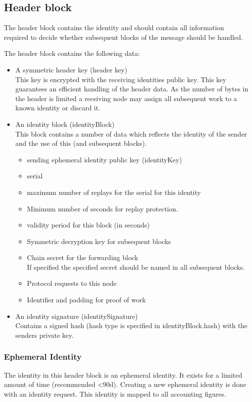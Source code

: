 \subsection{Header block}
The header block contains the identity and should contain all information required to decide whether subsequent blocks of the message should be handled.

The header block contains the following data:
\begin{itemize}
	\item A symmetric header key (header key)\\
	      This key is encrypted with the receiving identities public key. This key guarantees an efficient handling of the header data. As the number of bytes in the header is limited a receiving node may assign all subsequent work to a known identity or discard it.
	\item An identity block (identityBlock)\\
		  This block contains a number of data which reflects the identity of the sender and the use of this (and subsequent blocks).
		  \begin{itemize}
		  	\item sending ephemeral identity public key (identityKey)
		  	\item serial
		  	\item maximum number of replays for the serial for this identity
		  	\item Minimum number of seconds for replay protection.
		  	\item validity period for this block (in seconds)
		  	\item Symmetric decryption key for subsequent blocks
		  	\item Chain secret for the forwarding block\\
		  	      If specified the specified secret should be named in all subsequent blocks.
		  	\item Protocol requests to this node
		  	\item Identifier and padding for proof of work
		  \end{itemize}
	\item An identity signature (identitySignature)\\
	      Contains a signed hash (hash type is specified in identityBlock.hash) with the senders private key.
\end{itemize}

\subsubsection{Ephemeral Identity}
The identity in this header block is an ephemeral identity. It exists for a limited amount of time (recommended <90d). Creating a new ephemeral identity is done with an identity request. This identity is mapped to all accounting figures.

